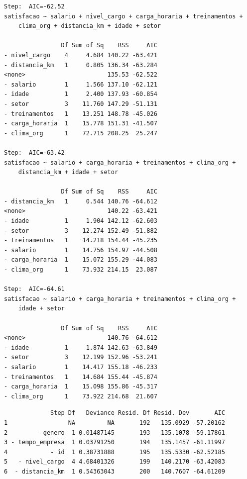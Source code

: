 \documentclass[
  letterpaper,
  DIV=11,
  numbers=noendperiod]{scrartcl}
\newenvironment{Shaded}{\begin{snugshade}}{\end{snugshade}}
\newcommand{\NormalTok}[1]{\textcolor[rgb]{0.00,0.23,0.31}{#1}}
\newcommand{\SpecialCharTok}[1]{\textcolor[rgb]{0.37,0.37,0.37}{#1}}
\begin{document}
\begin{verbatim}
Step:  AIC=-62.52
satisfacao ~ salario + nivel_cargo + carga_horaria + treinamentos + 
    clima_org + distancia_km + idade + setor

                Df Sum of Sq    RSS     AIC
- nivel_cargo    4     4.684 140.22 -63.421
- distancia_km   1     0.805 136.34 -63.284
<none>                       135.53 -62.522
- salario        1     1.566 137.10 -62.121
- idade          1     2.400 137.93 -60.854
- setor          3    11.760 147.29 -51.131
- treinamentos   1    13.251 148.78 -45.026
- carga_horaria  1    15.778 151.31 -41.507
- clima_org      1    72.715 208.25  25.247

Step:  AIC=-63.42
satisfacao ~ salario + carga_horaria + treinamentos + clima_org + 
    distancia_km + idade + setor

                Df Sum of Sq    RSS     AIC
- distancia_km   1     0.544 140.76 -64.612
<none>                       140.22 -63.421
- idade          1     1.904 142.12 -62.603
- setor          3    12.274 152.49 -51.882
- treinamentos   1    14.218 154.44 -45.235
- salario        1    14.756 154.97 -44.508
- carga_horaria  1    15.072 155.29 -44.083
- clima_org      1    73.932 214.15  23.087

Step:  AIC=-64.61
satisfacao ~ salario + carga_horaria + treinamentos + clima_org + 
    idade + setor

                Df Sum of Sq    RSS     AIC
<none>                       140.76 -64.612
- idade          1     1.874 142.63 -63.849
- setor          3    12.199 152.96 -53.241
- salario        1    14.417 155.18 -46.233
- treinamentos   1    14.684 155.44 -45.874
- carga_horaria  1    15.098 155.86 -45.317
- clima_org      1    73.922 214.68  21.607
\end{verbatim}

\begin{Shaded}
\end{Shaded}

\begin{verbatim}
             Step Df   Deviance Resid. Df Resid. Dev       AIC
1                 NA         NA       192   135.0929 -57.20162
2        - genero  1 0.01487145       193   135.1078 -59.17861
3 - tempo_empresa  1 0.03791250       194   135.1457 -61.11997
4            - id  1 0.38731888       195   135.5330 -62.52185
5   - nivel_cargo  4 4.68401326       199   140.2170 -63.42083
6  - distancia_km  1 0.54363043       200   140.7607 -64.61209
\end{verbatim}
\end{document}
